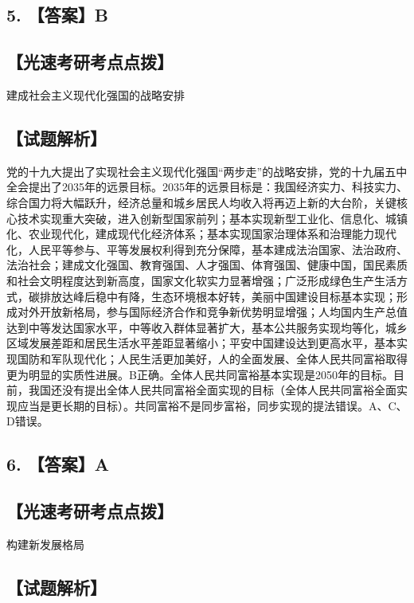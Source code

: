 \documentclass[UTF8,11pt]{ctexart}
\begin{document}
\subsection*{5. 【答案】B}

\subsection*{【光速考研考点点拨】}

建成社会主义现代化强国的战略安排


\subsection*{【试题解析】}

党的十九大提出了实现社会主义现代化强国“两步走”的战略安排，党的十九届五中全会提出了2035年的远景目标。2035年的远景目标是：我国经济实力、科技实力、综合国力将大幅跃升，经济总量和城乡居民人均收入将再迈上新的大台阶，关键核心技术实现重大突破，进入创新型国家前列；基本实现新型工业化、信息化、城镇化、农业现代化，建成现代化经济体系；基本实现国家治理体系和治理能力现代化，人民平等参与、平等发展权利得到充分保障，基本建成法治国家、法治政府、法治社会；建成文化强国、教育强国、人才强国、体育强国、健康中国，国民素质和社会文明程度达到新高度，国家文化软实力显著增强；广泛形成绿色生产生活方式，碳排放达峰后稳中有降，生态环境根本好转，美丽中国建设目标基本实现；形成对外开放新格局，参与国际经济合作和竞争新优势明显增强；人均国内生产总值达到中等发达国家水平，中等收入群体显著扩大，基本公共服务实现均等化，城乡区域发展差距和居民生活水平差距显著缩小；平安中国建设达到更高水平，基本实现国防和军队现代化；人民生活更加美好，人的全面发展、全体人民共同富裕取得更为明显的实质性进展。B正确。全体人民共同富裕基本实现是2050年的目标。目前，我国还没有提出全体人民共同富裕全面实现的目标（全体人民共同富裕全面实现应当是更长期的目标）。共同富裕不是同步富裕，同步实现的提法错误。A、C、D错误。


\subsection*{6. 【答案】A}

\subsection*{【光速考研考点点拨】}

构建新发展格局


\subsection*{【试题解析】}
\end{document}

